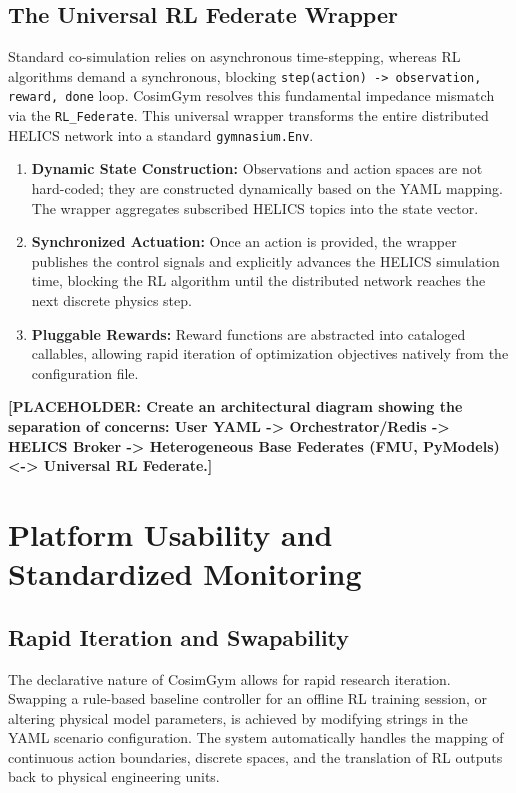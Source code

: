 \subsection{The Universal RL Federate Wrapper}
Standard co-simulation relies on asynchronous time-stepping, whereas RL algorithms demand a synchronous, blocking \texttt{step(action) -> observation, reward, done} loop.
CosimGym resolves this fundamental impedance mismatch via the \texttt{RL\_Federate}. This universal wrapper transforms the entire distributed HELICS network into a standard \texttt{gymnasium.Env}.
\begin{enumerate}
    \item \textbf{Dynamic State Construction:} Observations and action spaces are not hard-coded; they are constructed dynamically based on the YAML mapping. The wrapper aggregates subscribed HELICS topics into the state vector.
    \item \textbf{Synchronized Actuation:} Once an action is provided, the wrapper publishes the control signals and explicitly advances the HELICS simulation time, blocking the RL algorithm until the distributed network reaches the next discrete physics step.
    \item \textbf{Pluggable Rewards:} Reward functions are abstracted into cataloged callables, allowing rapid iteration of optimization objectives natively from the configuration file.
\end{enumerate}

\textbf{[PLACEHOLDER: Create an architectural diagram showing the separation of concerns: User YAML -> Orchestrator/Redis -> HELICS Broker -> Heterogeneous Base Federates (FMU, PyModels) <-> Universal RL Federate.]}

\section{Platform Usability and Standardized Monitoring}

\subsection{Rapid Iteration and Swapability}
The declarative nature of CosimGym allows for rapid research iteration. Swapping a rule-based baseline controller for an offline RL training session, or altering physical model parameters, is achieved by modifying strings in the YAML scenario configuration. The system automatically handles the mapping of continuous action boundaries, discrete spaces, and the translation of RL outputs back to physical engineering units.

